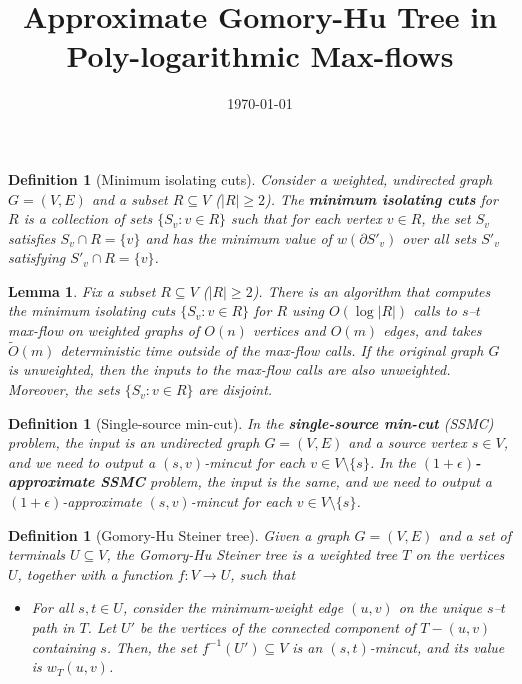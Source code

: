 \documentclass{article}
\newcommand{\sm}{\setminus}
\newcommand{\s}{\subseteq}
\newcommand{\im}{\item}
\newcommand{\BI}{\begin{itemize}}
\newcommand{\EI}{\end{itemize}}
\newcommand{\inv}{^{-1}}
\newcommand{\e}{\epsilon}
\newcommand{\pt}{\partial}
\newcommand{\1}{\mathbbm 1}
\newtheorem{lemma}[theorem]{Lemma}
\newtheorem{definition}[theorem]{Definition}
\newcommand{\BL}{\begin{lemma}}
\newcommand{\EL}{\end{lemma}}
\newcommand{\BD}{\begin{definition}}
\newcommand{\ED}{\end{definition}}
\newcommand{\alert}{\textcolor{red}}
\newcommand{\tO}{\tilde{O}}
\renewcommand{\emph}[1]{\textbf{\textup{#1}}}
\begin{document}
\title{Approximate Gomory-Hu Tree in Poly-logarithmic Max-flows}
\author{}
\date{\today}
\maketitle

\BD[Minimum isolating cuts]
Consider a weighted, undirected graph $G=(V,E)$ and a subset $R\s V$ ($|R|\ge2$). The \emph{minimum isolating cuts} for $R$ is a collection of sets $\{S_v:v\in R\}$ such that for each vertex $v\in R$, the set $S_v$ satisfies $S_v\cap R=\{v\}$ and has the minimum value of $w(\pt S'_v)$ over all sets $S'_v$ satisfying $S'_v\cap R=\{v\}$.
\ED


\BL
Fix a subset $R\s V$ ($|R|\ge2$). There is an algorithm that computes the minimum isolating cuts $\{S_v:v\in R\}$ for $R$ using $O(\log|R|)$ calls to $s$--$t$ max-flow on weighted graphs of $O(n)$ vertices and $O(m)$ edges, and takes $\tO(m)$ deterministic time outside of the max-flow calls. If the original graph $G$ is unweighted, then the inputs to the max-flow calls are also unweighted. Moreover, the sets $\{S_v:v\in R\}$ are disjoint.
\EL


\BD[Single-source min-cut]
In the \emph{single-source min-cut} (SSMC) problem, the input is an undirected graph $G=(V,E)$ and a source vertex $s\in V$, and we need to output a $(s,v)$-mincut for each $v\in V\sm \{s\}$. In the \emph{$(1+\e)$-approximate SSMC} problem, the input is the same, and we need to output a $(1+\e)$-approximate $(s,v)$-mincut for each $v\in V\sm \{s\}$.
\ED


\BD[Gomory-Hu Steiner tree]
Given a graph $G=(V,E)$ and a set of terminals $U\s V$, the Gomory-Hu Steiner tree is a weighted tree $T$ on the vertices $U$, together with a function $f:V\to U$, such that
 \BI
 \im For all $s,t\in U$, consider the minimum-weight edge $(u,v)$ on the unique $s$--$t$ path in $T$. Let $U'$ be the vertices of the connected component of $T-(u,v)$ containing $s$.
Then, the set $f\inv(U')\s V$ is an $(s,t)$-mincut, and its value is $w_T(u,v)$.
 \EI
\ED
\end{document}
